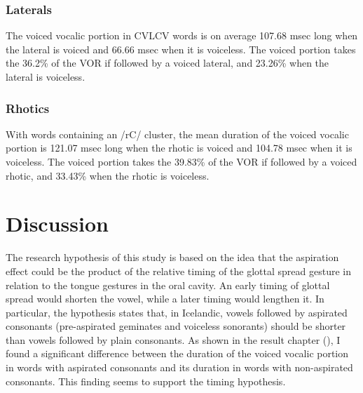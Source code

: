\documentclass[11pt,a4paper,openany]{memoir}\usepackage[]{graphicx}\usepackage[]{color}
\begin{document}
\subsection{Laterals}



The voiced vocalic portion in CVLCV words is on average 107.68 msec long when the lateral is voiced and 66.66 msec when it is voiceless.
The voiced portion takes the 36.2\% of the VOR if followed by a voiced lateral, and 23.26\% when the lateral is voiceless.


\subsection{Rhotics}



With words containing an /rC/ cluster, the mean duration of the voiced vocalic portion is 121.07 msec long when the rhotic is voiced and 104.78 msec when it is voiceless.
The voiced portion takes the 39.83\% of the VOR if followed by a voiced rhotic, and 33.43\% when the rhotic is voiceless.








\chapter{Discussion}

The research hypothesis of this study is based on the idea that the aspiration effect could be the product of the relative timing of the glottal spread gesture in relation to the tongue gestures in the oral cavity.
An early timing of glottal spread would shorten the vowel, while a later timing would lengthen it.
In particular, the hypothesis states that, in Icelandic, vowels followed by aspirated consonants (pre-aspirated geminates and voiceless sonorants) should be shorter than vowels followed by plain consonants.
As shown in the result chapter (), I found a significant difference between the duration of the voiced vocalic portion in words with aspirated consonants and its duration in words with non-aspirated consonants.
This finding seems to support the timing hypothesis.
\end{document}
